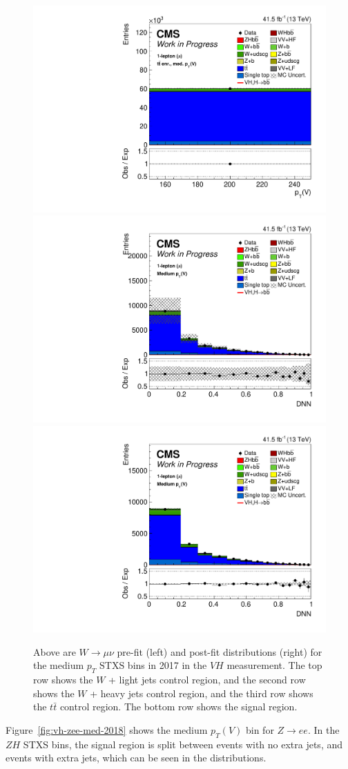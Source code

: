 \begin{figure}
  \includegraphics[width=0.35\linewidth]{figures/210322_STXSfine_400split_unblinded_Xbb_025349b6_postfitplots/plot_shapes_vhbb_Wmn_8_13TeV2017_postfit.pdf} \\
  \includegraphics[width=0.35\linewidth]{figures/210322_STXSfine_400split_unblinded_Xbb_025349b6_postfitplots/plot_shapes_vhbb_Wmn_5_13TeV2017_prefit.pdf}
  \includegraphics[width=0.35\linewidth]{figures/210322_STXSfine_400split_unblinded_Xbb_025349b6_postfitplots/plot_shapes_vhbb_Wmn_5_13TeV2017_postfit.pdf} \\
  \caption[$W\rightarrow \mu\nu$ $V\!H$ distributions for medium $p_T$ in 2017]{
    Above are $W\rightarrow \mu\nu$ pre-fit (left) and post-fit distributions (right)
    for the medium $p_T$ STXS bins in 2017 in the $V\!H$ measurement.
    The top row shows the $W$ + light jets control region, and
    the second row shows the $W$ + heavy jets control region, and
    the third row shows the $t\bar{t}$ control region.
    The bottom row shows the signal region.
  }
  \label{fig:vh-wmn-med-2017}
\end{figure}
%
Figure~\ref{fig:vh-zee-med-2018} shows the medium $p_T(V)$ bin for $Z\rightarrow ee$.
In the $Z\!H$ STXS bins, the signal region is split between events with no extra jets,
and events with extra jets, which can be seen in the distributions.
%
